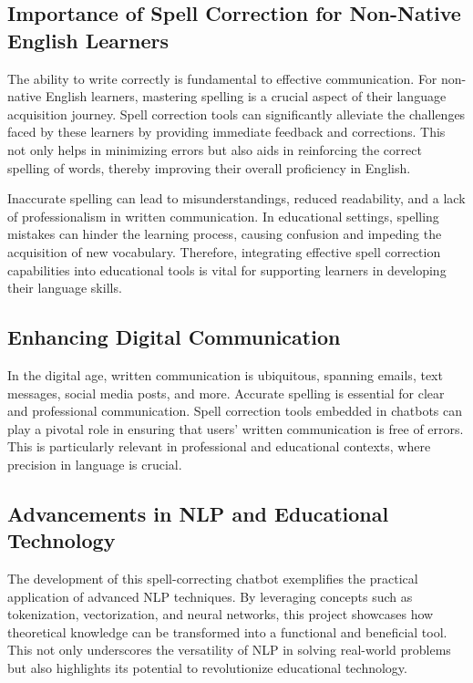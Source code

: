 \subsection{Importance of Spell Correction for Non-Native English Learners}
The ability to write correctly is fundamental to effective communication. For non-native English learners, mastering spelling is a crucial aspect of their language acquisition journey. Spell correction tools can significantly alleviate the challenges faced by these learners by providing immediate feedback and corrections. This not only helps in minimizing errors but also aids in reinforcing the correct spelling of words, thereby improving their overall proficiency in English.

Inaccurate spelling can lead to misunderstandings, reduced readability, and a lack of professionalism in written communication. In educational settings, spelling mistakes can hinder the learning process, causing confusion and impeding the acquisition of new vocabulary. Therefore, integrating effective spell correction capabilities into educational tools is vital for supporting learners in developing their language skills.

\subsection{Enhancing Digital Communication}
In the digital age, written communication is ubiquitous, spanning emails, text messages, social media posts, and more. Accurate spelling is essential for clear and professional communication. Spell correction tools embedded in chatbots can play a pivotal role in ensuring that users' written communication is free of errors. This is particularly relevant in professional and educational contexts, where precision in language is crucial.

\subsection{Advancements in NLP and Educational Technology}
The development of this spell-correcting chatbot exemplifies the practical application of advanced NLP techniques. By leveraging concepts such as tokenization, vectorization, and neural networks, this project showcases how theoretical knowledge can be transformed into a functional and beneficial tool. This not only underscores the versatility of NLP in solving real-world problems but also highlights its potential to revolutionize educational technology.